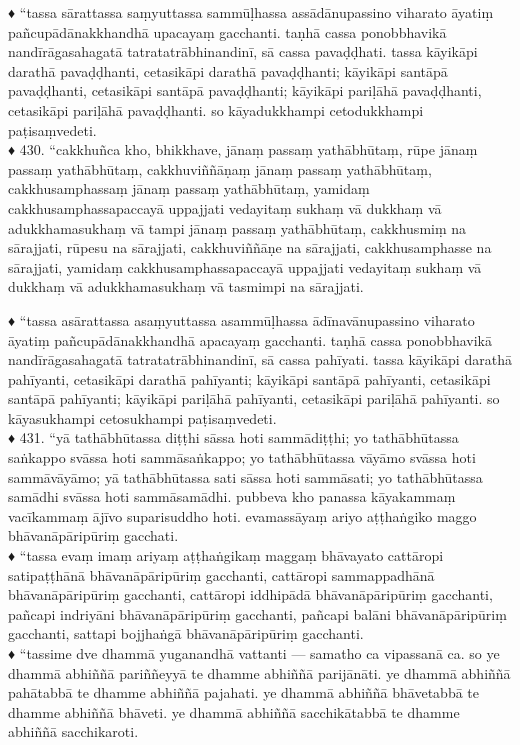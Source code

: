\documentclass[11pt]{article}
\begin{document}
♦ “tassa sārattassa saṃyuttassa sammūḷhassa assādānupassino viharato āyatiṃ pañcupādānakkhandhā upacayaṃ gacchanti. taṇhā cassa ponobbhavikā nandīrāgasahagatā tatratatrābhinandinī, sā cassa pavaḍḍhati. tassa kāyikāpi darathā pavaḍḍhanti, cetasikāpi darathā pavaḍḍhanti; kāyikāpi santāpā pavaḍḍhanti, cetasikāpi santāpā pavaḍḍhanti; kāyikāpi pariḷāhā pavaḍḍhanti, cetasikāpi pariḷāhā pavaḍḍhanti. so kāyadukkhampi cetodukkhampi paṭisaṃvedeti.\\
♦ 430. “cakkhuñca kho, bhikkhave, jānaṃ passaṃ yathābhūtaṃ, rūpe jānaṃ passaṃ yathābhūtaṃ, cakkhuviññāṇaṃ jānaṃ passaṃ yathābhūtaṃ, cakkhusamphassaṃ jānaṃ passaṃ yathābhūtaṃ, yamidaṃ cakkhusamphassapaccayā uppajjati vedayitaṃ sukhaṃ vā dukkhaṃ vā adukkhamasukhaṃ vā tampi jānaṃ passaṃ yathābhūtaṃ, cakkhusmiṃ na sārajjati, rūpesu na sārajjati, cakkhuviññāṇe na sārajjati, cakkhusamphasse na sārajjati, yamidaṃ cakkhusamphassapaccayā uppajjati vedayitaṃ sukhaṃ vā dukkhaṃ vā adukkhamasukhaṃ vā tasmimpi na sārajjati.

♦ “tassa asārattassa asaṃyuttassa asammūḷhassa ādīnavānupassino viharato āyatiṃ pañcupādānakkhandhā apacayaṃ gacchanti. taṇhā cassa ponobbhavikā nandīrāgasahagatā tatratatrābhinandinī, sā cassa pahīyati. tassa kāyikāpi darathā pahīyanti, cetasikāpi darathā pahīyanti; kāyikāpi santāpā pahīyanti, cetasikāpi santāpā pahīyanti; kāyikāpi pariḷāhā pahīyanti, cetasikāpi pariḷāhā pahīyanti. so kāyasukhampi cetosukhampi paṭisaṃvedeti.\\

♦ 431. “yā tathābhūtassa diṭṭhi sāssa hoti sammādiṭṭhi; yo tathābhūtassa saṅkappo svāssa hoti sammāsaṅkappo; yo tathābhūtassa vāyāmo svāssa hoti sammāvāyāmo; yā tathābhūtassa sati sāssa hoti sammāsati; yo tathābhūtassa samādhi svāssa hoti sammāsamādhi. pubbeva kho panassa kāyakammaṃ vacīkammaṃ ājīvo suparisuddho hoti. evamassāyaṃ ariyo aṭṭhaṅgiko maggo bhāvanāpāripūriṃ gacchati.\\

♦ “tassa evaṃ imaṃ ariyaṃ aṭṭhaṅgikaṃ maggaṃ bhāvayato cattāropi satipaṭṭhānā bhāvanāpāripūriṃ gacchanti, cattāropi sammappadhānā bhāvanāpāripūriṃ gacchanti, cattāropi iddhipādā bhāvanāpāripūriṃ gacchanti, pañcapi indriyāni bhāvanāpāripūriṃ gacchanti, pañcapi balāni bhāvanāpāripūriṃ gacchanti, sattapi bojjhaṅgā bhāvanāpāripūriṃ gacchanti.\\

♦ “tassime dve dhammā yuganandhā vattanti — samatho ca vipassanā ca. so ye dhammā abhiññā pariññeyyā te dhamme abhiññā parijānāti. ye dhammā abhiññā pahātabbā te dhamme abhiññā pajahati. ye dhammā abhiññā bhāvetabbā te dhamme abhiññā bhāveti. ye dhammā abhiññā sacchikātabbā te dhamme abhiññā sacchikaroti.\\
\end{document}
